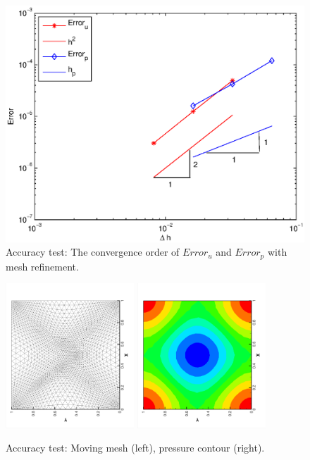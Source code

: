 \documentclass[mathpazo]{aamm}
\begin{document}
       \begin{figure}[!htbp]
         \centering
           \includegraphics[width = 1.0\textwidth, angle =
           0]{picture/accuracy_flow/convergence_order.eps}
           \caption{Accuracy test:  The convergence order of $Error_u$ and $Error_p$
             with mesh refinement.}
           \label{fig::convergence_order}
       \end{figure}
       \begin{figure}
          \centering
          \includegraphics[width = 0.43\textwidth, angle = -90]{picture/accuracy_flow/accuray_mesh20.eps}
          \includegraphics[width = 0.43\textwidth, angle = -90]{picture/accuracy_flow/pressure_mesh20.eps}
          \caption{\small Accuracy test: Moving mesh (left), pressure
            contour (right).}
        \label{fig::accuracy_mesh}
       \end{figure}
       
\end{document}
